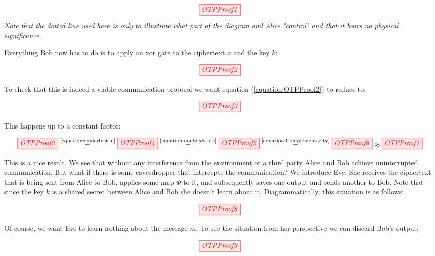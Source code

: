 \documentclass[]{article}
\newcommand{\equaltext}[1]{\ensuremath{\stackrel{\text{#1}}{=}}}
\begin{document}
\begin{equation}
	\tikzfig{OTPProof1}
\end{equation}
\textit{Note that the dotted line used here is only to illustrate what part of the diagram and Alice "control" and that it bears no physical significance.}


Everything Bob now has to do is to apply an xor gate to the ciphertext $x$ and the key $k$:

\begin{equation}
\label{equation:OTPProof2}
\tikzfig{OTPProof2}
\end{equation}

To check that this is indeed a viable communication protocol we want equation (\ref{equation:OTPProof2}) to reduce to:

\begin{equation}
\label{equation:OTPProof3}
\tikzfig{OTPProof3}
\end{equation}

This happens up to a constant factor:

\begin{equation}
\label{equation:OTPProoflong}
\tikzfig{OTPProof2}\equaltext{\ref{equation:spiderfusion}} \tikzfig{OTPProof4} \equaltext{\ref{equation:doubledstate}} \tikzfig{OTPProof5} \equaltext{\ref{equation:Complementarity}} \tikzfig{OTPProof6} \approx \tikzfig{OTPProof7}
\end{equation}

This is a nice result. We see that without any interference from the environment or a third party Alice and Bob achieve uninterrupted communication. But what if there is some eavesdropper that intercepts the communication? We introduce Eve. She receives the ciphertext that is being sent from Alice to Bob, applies some map $\Phi$ to it, and subsequently saves one output and sends another to Bob. Note that since the key $k$ is a shared secret between Alice and Bob she doesn't learn about it. Diagrammatically, this situation is as follows:

\begin{equation}
	\tikzfig{OTPProof8}
\end{equation}

Of course, we want Eve to learn nothing about the message $m$. To see the situation from her perspective we can discard Bob's output:

\begin{equation}
	\tikzfig{OTPProof9}
\end{equation}
\end{document}
